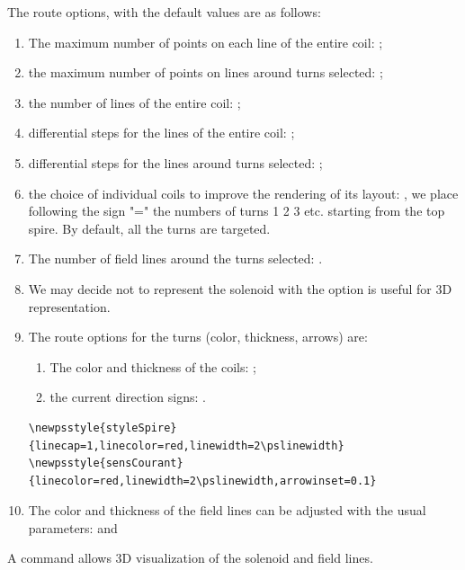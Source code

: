 \documentclass[11pt,english,bibliography=totoc,parskip=false,headings=small,usegeometry,]{pst-doc}
\begin{document}
The route options, with the default values are as follows:
\begin{enumerate}
  \item The maximum number of points on each line of the entire coil: ;
  \item the maximum number of points on lines around turns selected: ;
  \item the number of lines of the entire coil: ;
  \item differential steps for the lines of the entire coil: ;
  \item differential steps for the lines around turns selected: ;
  \item the choice of individual coils to improve the rendering of its
      layout: , we place following the sign "=" the numbers of turns \textsf{1 2 3 etc.} 
      starting from the top spire. By default, all the turns are targeted.
  \item The number of field lines around the turns selected: .
  \item We may decide not to represent the solenoid with the option 
      is useful for 3D representation.
  \item The route options for the turns (color, thickness, arrows) are:
  \begin{enumerate}
        \item The color and thickness of the coils: ;
        \item the current direction signs: .
  \end{enumerate}
\begin{verbatim}
\newpsstyle{styleSpire}{linecap=1,linecolor=red,linewidth=2\pslinewidth}
\newpsstyle{sensCourant}{linecolor=red,linewidth=2\pslinewidth,arrowinset=0.1}
\end{verbatim}
      
 \item The color and thickness of the field lines can be adjusted with the 
      usual  parameters:  and  
\end{enumerate}

A command  allows 3D visualization of the solenoid and
field lines. 

\begin{BDef}
\OptArgs{}\\
\OptArgs{}
\end{BDef}
\end{document}

